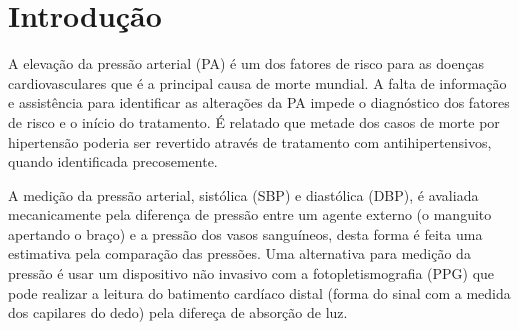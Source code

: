 \documentclass[conference,compsoc]{IEEEtran}
\begin{document}




\maketitle


\begin{abstract}
O objetivo deste trabalho \'e aplicar t\'ecnicas de aprendizado de m\'aquinas para estimar a press\~ao arterial a partir da base de dados de fotopletismografia. \'E realizado o tratamento da base de dados com um filtro passa baixa de 50Hz e a transformada r\'apida de Fourier (FFT) para utilizar os dados na rede neural <COMPLETE AQUI>
\end{abstract}



%
\IEEEpeerreviewmaketitle


\section{Introdu\c{c}\~{a}o}
A eleva\c{c}\~ao da press\~ao arterial (PA) \'e um dos fatores de risco para as doen\c{c}as cardiovasculares que \'e a principal causa de morte mundial. A falta de informa\c{c}\~ao e assist\^encia para identificar as altera\c{c}\~oes da PA impede o diagn\'ostico dos fatores de risco e o in\'icio do tratamento. \'E relatado que metade dos casos de morte por hipertens\~ao poderia ser revertido atrav\'es de tratamento com antihipertensivos, quando identificada precosemente. \cite{KISHORE:2008}

A medi\c{c}\~ao da press\~ao arterial, sist\'olica (SBP) e diast\'olica (DBP), \'e avaliada mecanicamente pela diferen\c{c}a de press\~ao entre um agente externo (o manguito apertando o bra\c{c}o) e a press\~ao dos vasos sangu\'ineos, desta forma \'e feita uma estimativa pela compara\c{c}\~ao das press\~oes. Uma alternativa para medi\c{c}\~ao da press\~ao \'e usar um dispositivo n\~ao invasivo com a fotopletismografia (PPG) que pode realizar a leitura do batimento card\'iaco distal (forma do sinal com a medida dos capilares do dedo) pela difere\c{c}a de absor\c{c}\~ao de luz. \cite{MORENO:2011}
\end{document}
